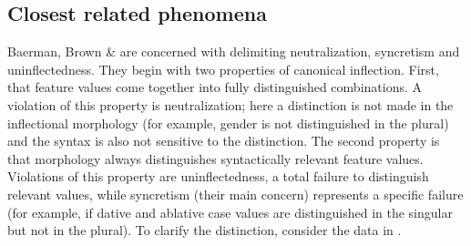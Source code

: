 \documentclass[output=paper]{langscibook}
\begin{document}
\subsection{\textbf{Closest} \textbf{related} \textbf{phenomena}}

Baerman, Brown \& \citet[27-35]{Corbett2005} are concerned with delimiting neutralization, syncretism and uninflectedness. They begin with two properties of canonical inflection. First, that feature values come together into fully distinguished combinations. A violation of this property is neutralization; here a distinction is not made in the inflectional morphology (for example, gender is not distinguished in the plural) and the syntax is also not sensitive to the distinction. The second property is that morphology always distinguishes syntactically relevant feature values. Violations of this property are uninflectedness, a total failure to distinguish relevant values, while syncretism (their main concern) represents a specific failure (for example, if dative and ablative case values are distinguished in the singular but not in the plural). To clarify the distinction, consider the data in .
\end{document}
